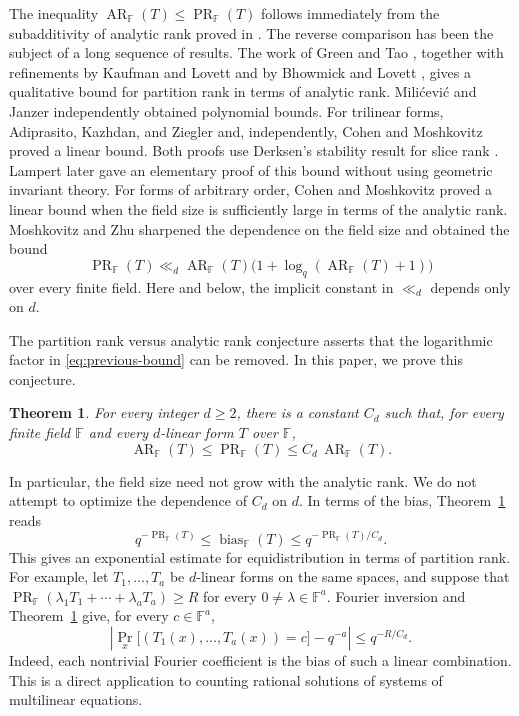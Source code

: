 \documentclass[11pt,reqno]{amsart}
\theoremstyle{plain}
\newtheorem{theorem}{Theorem}[section]
\theoremstyle{definition}
\newcommand{\F}{\mathbb F}
\DeclareMathOperator{\bias}{bias}
\DeclareMathOperator{\Prob}{Pr}
\DeclareMathOperator{\arank}{AR}
\DeclareMathOperator{\prank}{PR}
\begin{document}
The inequality $\arank_{\F}(T)\leq\prank_{\F}(T)$ follows immediately from
the subadditivity of analytic rank proved in \cite{lovett2018analytic}. The reverse comparison
has been the subject of a long sequence of results. The work of Green
and Tao \cite{GreenTao}, together with refinements by Kaufman and Lovett
\cite{KaufmanLovett} and by Bhowmick and Lovett \cite{BhowmickLovett},
gives a qualitative bound for partition rank in terms of analytic rank.
Mili\'cevi\'c \cite{milicevic2019polynomial} and Janzer \cite{janzer2019polynomial} independently obtained polynomial bounds. For trilinear
forms, Adiprasito, Kazhdan, and Ziegler \cite{adiprasito2021schmidt} and, independently, Cohen and Moshkovitz \cite{CMBilinear} proved a linear bound. Both proofs use Derksen's stability result for slice rank \cite{derksen2022g}.
Lampert \cite{Lampert2025} later gave an elementary proof of this bound without using geometric invariant theory.
For forms of arbitrary order, Cohen and Moshkovitz \cite{CM} proved a linear
bound when the field size is sufficiently large in terms of the
analytic rank. Moshkovitz and Zhu \cite[Theorem~2]{MZLocal} sharpened the dependence on the field size and obtained
the bound
\begin{equation}\label{eq:previous-bound}
 \prank_{\F}(T)\ll_d
 \arank_{\F}(T)\bigl(1+\log_q(\arank_{\F}(T)+1)\bigr)
\end{equation}
over every finite field. Here and below, the implicit constant in
$\ll_d$ depends only on $d$.

The partition rank versus analytic rank conjecture
\cite{lovett2018analytic,KZApplications,adiprasito2021schmidt} asserts that the logarithmic factor in \eqref{eq:previous-bound} can be removed. In this paper, we prove this conjecture.

\begin{theorem}\label{thm:main}
For every integer $d\geq2$, there is a constant $C_d$ such that, for
every finite field $\F$ and every $d$-linear form $T$ over $\F$,
\[
 \arank_{\F}(T)\leq\prank_{\F}(T)
 \leq C_d\,\arank_{\F}(T).
\]
\end{theorem}

In particular, the field size need not grow with the analytic rank.
We do not attempt to optimize the dependence of $C_d$ on $d$.
In terms of the bias, Theorem~\ref{thm:main} reads
\[
 q^{-\prank_{\F}(T)}\leq\bias_{\F}(T)
 \leq q^{-\prank_{\F}(T)/C_d}.
\]
This gives an exponential estimate for equidistribution in terms of
partition rank. For example, let $T_1,\ldots,T_a$ be $d$-linear forms
on the same spaces, and suppose that $\prank_{\F}(\lambda_1T_1+\cdots+\lambda_aT_a)\geq R$
for every $0\ne\lambda\in\F^a$. Fourier inversion and
Theorem~\ref{thm:main} give, for every $c\in\F^a$,
\[
 \left|\Prob_x\bigl[(T_1(x),\ldots,T_a(x))=c\bigr]-q^{-a}\right|
 \leq q^{-R/C_d}.
\]
Indeed, each nontrivial Fourier coefficient is the bias of such a
linear combination. This is a direct application to counting rational
solutions of systems of multilinear equations.
\end{document}

